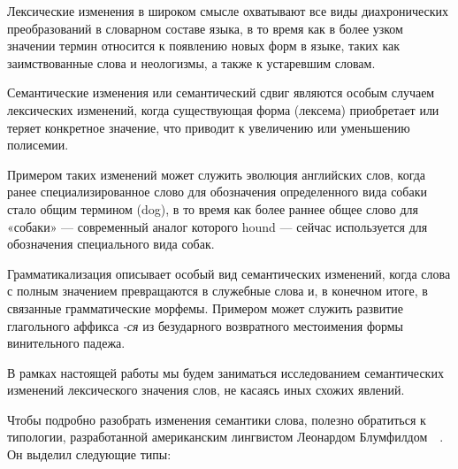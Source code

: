 \documentclass[LI,VKR]{HSEUniversity}
\begin{document}
Лексические изменения в широком смысле охватывают все виды диахронических преобразований
в словарном составе языка, в то время как в более узком значении термин относится к
появлению новых форм в языке, таких как заимствованные слова и неологизмы,
а также к устаревшим словам.

Семантические изменения или семантический сдвиг являются особым случаем лексических изменений,
когда существующая форма (лексема) приобретает или теряет конкретное значение,
что приводит к увеличению или уменьшению полисемии.

Примером таких изменений может служить эволюция английских слов, когда ранее специализированное
слово для обозначения определенного вида собаки стало общим термином (dog),
в то время как более раннее общее слово для «собаки» — современный аналог которого
hound — сейчас используется для обозначения специального вида собак.

Грамматикализация описывает особый вид семантических изменений, когда слова с
полным значением превращаются в служебные слова и, в конечном итоге,
в связанные грамматические морфемы.
Примером может служить развитие глагольного аффикса \textit{-ся} из
безударного возвратного местоимения формы винительного падежа.

В рамках настоящей работы мы будем заниматься исследованием семантических изменений
лексического значения слов, не касаясь иных схожих явлений.

Чтобы подробно разобрать изменения семантики слова,
полезно обратиться к типологии,
разработанной американским лингвистом Леонардом Блумфилдом~~\cite{BloomfieldLanguage,
    Harris2014SemanticShifts}.
Он выделил следующие типы:
\end{document}
